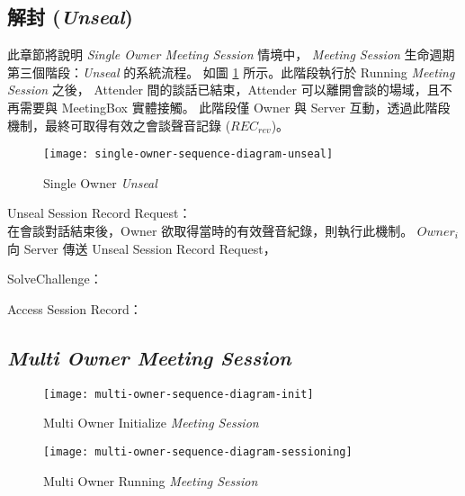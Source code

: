 \subsection{解封 ({\it Unseal})}

    此章節將說明 {\it Single Owner Meeting Session} 情境中，
{\it Meeting Session} 生命週期第三個階段：{\it Unseal} 的系統流程。
如圖 \ref{fig.s-o-unseal} 所示。此階段執行於 Running {\it Meeting Session} 之後，
Attender 間的談話已結束，Attender 可以離開會談的場域，且不再需要與 MeetingBox 實體接觸。
此階段僅 Owner 與 Server 互動，透過此階段機制，最終可取得有效之會談聲音記錄 ($REC_{rev}$)。

\begin{figure}[H]
    \centering
    \texttt{[image: single-owner-sequence-diagram-unseal]}
    \caption{Single Owner {\it Unseal}}
    \label{fig.s-o-unseal}
\end{figure}

\begin{steps}
    \item Unseal Session Record Request：\\
        在會談對話結束後，Owner 欲取得當時的有效聲音紀錄，則執行此機制。
        $Owner_{i}$ 向 Server 傳送 Unseal Session Record Request，

    \item SolveChallenge：\\

    \item Access Session Record：\\

\end{steps}


\subsection{{\it Multi Owner Meeting Session}}

\begin{figure}[H]
    \centering
    \texttt{[image: multi-owner-sequence-diagram-init]}
    \caption{Multi Owner Initialize {\it Meeting Session}}
    \label{fig.m-o-init}
\end{figure}

\begin{figure}[H]
    \centering
    \texttt{[image: multi-owner-sequence-diagram-sessioning]}
    \caption{Multi Owner Running {\it Meeting Session}}
    \label{fig.m-o-sessioning}
\end{figure}

